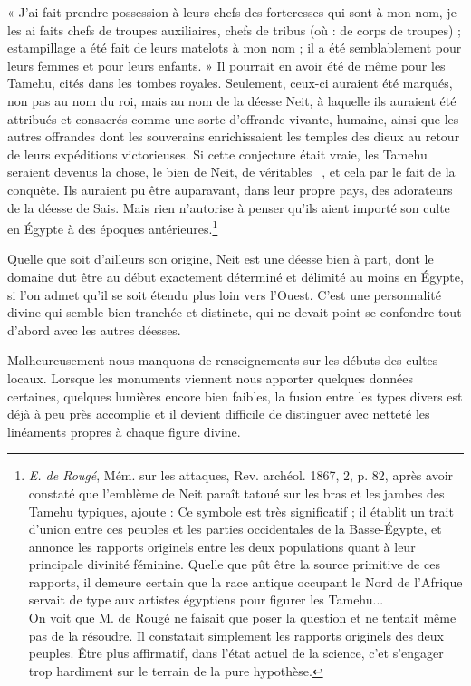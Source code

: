 \documentclass[letterpaper,twocolumn,openany,nodeprecatedcode]{dndbook}
\newcommand*\hieroAADS{}
\newcommand*\hieroAAEF{}
\newcommand*\hieroAAEK{}
\begin{document}
« J'ai fait prendre possession à leurs chefs des forteresses qui sont à mon nom, je les ai faits chefs de troupes auxiliaires, chefs de tribus (où : de corps de troupes) ; estampillage a été fait de leurs matelots à mon nom ; il a été semblablement pour leurs femmes et pour leurs enfants. »
Il pourrait en avoir été de même pour les Tamehu, cités dans les tombes royales. Seulement, ceux-ci auraient été marqués, non pas au nom du roi, mais au nom de la déesse Neit, à laquelle ils auraient été attribués et consacrés comme une sorte d'offrande vivante, humaine, ainsi que les autres offrandes dont les souverains enrichissaient les temples des dieux au retour de leurs expéditions victorieuses. Si cette conjecture était vraie, les Tamehu seraient devenus la chose, le bien de Neit, de véritables $\hieroAAEK\:\hieroAADS\:\hieroAAEF$, et cela par le fait de la conquête. Ils auraient pu être auparavant, dans leur propre pays, des adorateurs de la déesse de Sais. Mais rien n'autorise à penser qu'ils aient importé son culte en Égypte à des époques antérieures.\footnote{\emph{E. de Rougé}, Mém. sur les attaques, Rev. archéol. 1867, 2, p. 82, après avoir constaté que l'emblème de Neit paraît tatoué sur les bras et les jambes des Tamehu typiques, ajoute : Ce symbole est très significatif ; il établit un trait d'union entre ces peuples et les parties occidentales de la Basse-Égypte, et annonce les rapports originels entre les deux populations quant à leur principale divinité féminine. Quelle que pût être la source primitive de ces rapports, il demeure certain que la race antique occupant le Nord de l'Afrique servait de type aux artistes égyptiens pour figurer les Tamehu...\\\hspace*{5mm}On voit que M. de Rougé ne faisait que poser la question et ne tentait même pas de la résoudre. Il constatait simplement les rapports originels des deux peuples. Être plus affirmatif, dans l'état actuel de la science, c'et s'engager trop hardiment sur le terrain de la pure hypothèse.}

Quelle que soit d'ailleurs son origine, Neit est une déesse bien à part, dont le domaine dut être au début exactement déterminé et délimité au moins en Égypte, si l'on admet qu'il se soit étendu plus loin vers l'Ouest. C'est une personnalité divine qui semble bien tranchée et distincte, qui ne devait point se confondre tout d'abord avec les autres déesses.

Malheureusement nous manquons de renseignements sur les débuts des cultes locaux. Lorsque les monuments viennent nous apporter quelques données certaines, quelques lumières encore bien faibles, la fusion entre les types divers est déjà à peu près accomplie et il devient difficile de distinguer avec netteté les linéaments propres à chaque figure divine.
\end{document}
